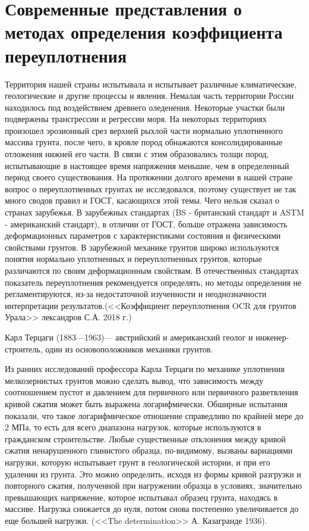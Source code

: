 \chapter{Современные представления о методах определения коэффициента переуплотнения}

Территория нашей страны испытывала и испытывает различные климатические, геологические и другие процессы и явления. Немалая часть территории России находилось под воздействием древнего оледенения. Некоторые участки были подвержены трансгрессии и регрессии моря. На некоторых территориях произошел эрозионный срез верхней рыхлой части нормально уплотненного массива грунта, после чего, в кровле пород обнажаются консолидированные отложения нижней его части. В связи с этим образовались толщи пород, испытывающие в настоящее время напряжения меньшие, чем в определенный период своего существования.
На протяжении долгого времени в нашей стране вопрос о переуплотненных грунтах не исследовался, поэтому существует не так много сводов правил и ГОСТ, касающихся этой темы. Чего нельзя сказал о странах зарубежья. 
В зарубежных стандартах (BS - британский стандарт и ASTM - американский стандарт), в отличии от ГОСТ, больше отражена зависимость деформационных параметров с характеристиками состояния и физическими свойствами грунтов. В зарубежной механике грунтов широко используются понятия нормально уплотненных и переуплотненных грунтов, которые различаются по своим деформационным свойствам. В отечественных стандартах показатель переуплотнения рекомендуется определять, но методы определения не регламентируются, из-за недостаточной изученности и неоднозначности интерпретации результатов.(<<Коэффициент переуплотнения OCR  для грунтов Урала>> лександров С.А. 2018 г.)

Карл Терцаги (1883—1963)— австрийский и американский геолог и инженер-строитель, один из основоположников механики грунтов.

Из ранних исследований профессора Карла Терцаги по механике уплотнения мелкозернистых грунтов можно сделать вывод, что зависимость между соотношением пустот и давлением для первичного или первичного разветвления кривой сжатия может быть выражена логарифмически. Обширные испытания показали, что такое логарифмическое отношение справедливо по крайней мере до 2 МПа, то есть для всего диапазона нагрузок, которые используются в гражданском строительстве. Любые существенные отклонения между кривой сжатия ненарушенного глинистого образца, по-видимому, вызваны вариациями нагрузки, которую испытывает грунт в геологической истории, и при его удалении из грунта. Это можно определить, исходя из формы кривой разгрузки и повторного сжатия, полученной при нагружении образца в условиях, значительно превышающих напряжение, которое испытывал образец грунта, находясь в массиве. Нагрузка снижается до нуля, потом снова постепенно увеличивается до еще большей нагрузки. (<<The determination>> А. Казагранде 1936). \cite{boone_critical_2010}
 
